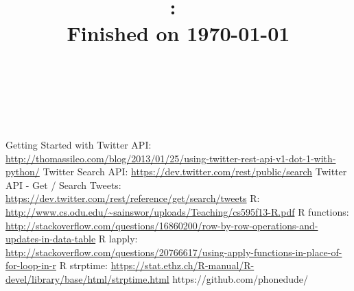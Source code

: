 \documentclass[letterpaper,12pt]{article}
\title{
\vspace{2in}
\textmd{\textbf{\Class:\ \AssignmentTitle}}\\
\normalsize\vspace{0.1in}\small{Finished on \today}\\
\vspace{0.1in}\large{\textit{\Instructor\ }}
\vspace{3in}
}
\author{\textbf{\MyName} \\ \MyEmail}
\date{}
\begin{document}
\begin{titlepage}
\clearpage\maketitle
\thispagestyle{empty}
\end{titlepage}


\newpage
\clearpage
\tableofcontents
\lstlistoflistings
\listoffigures
\thispagestyle{empty}





\newpage
\vspace*{5pt}

\begin{thebibliography}{9}
\bibitem{} Getting Started with Twitter API: \url{http://thomassileo.com/blog/2013/01/25/using-twitter-rest-api-v1-dot-1-with-python/}
\bibitem{}Twitter Search API: \url{https://dev.twitter.com/rest/public/search}
\bibitem{}Twitter API - Get / Search Tweets: \url{https://dev.twitter.com/rest/reference/get/search/tweets}
\bibitem{}R: \url{http://www.cs.odu.edu/~sainswor/uploads/Teaching/cs595f13-R.pdf}
\bibitem{}R functions: \url{http://stackoverflow.com/questions/16860200/row-by-row-operations-and-updates-in-data-table}
\bibitem{}R lapply: \url{http://stackoverflow.com/questions/20766617/using-apply-functions-in-place-of-for-loop-in-r}
\bibitem{}R strptime: \url{https://stat.ethz.ch/R-manual/R-devel/library/base/html/strptime.html}
\bibitem{}https://github.com/phonedude/
\end{thebibliography}
\end{document}
